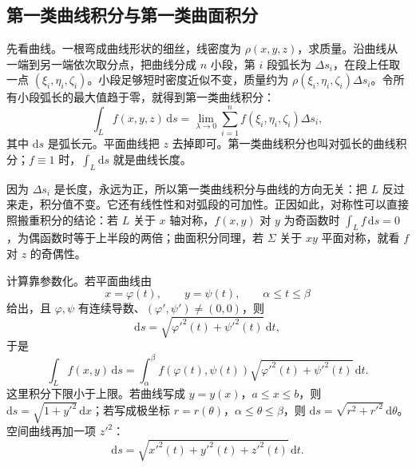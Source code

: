 \subsection{第一类曲线积分与第一类曲面积分}

先看曲线。一根弯成曲线形状的细丝，线密度为 $\rho(x,y,z)$，求质量。沿曲线从一端到另一端依次取分点，把曲线分成 $n$ 小段，第 $i$ 段弧长为 $\Delta s_i$，在段上任取一点 $(\xi_i,\eta_i,\zeta_i)$。小段足够短时密度近似不变，质量约为 $\rho(\xi_i,\eta_i,\zeta_i)\Delta s_i$。令所有小段弧长的最大值趋于零，就得到第一类曲线积分：
\[
    \int_L f(x,y,z)\,\mathrm ds
    =\lim_{\lambda\to0}\sum_{i=1}^{n}f(\xi_i,\eta_i,\zeta_i)\Delta s_i ,
\]
其中 $\mathrm ds$ 是弧长元。平面曲线把 $z$ 去掉即可。第一类曲线积分也叫对弧长的曲线积分；$f\equiv1$ 时，$\int_L\mathrm ds$ 就是曲线长度。

因为 $\Delta s_i$ 是长度，永远为正，所以第一类曲线积分与曲线的方向无关：把 $L$ 反过来走，积分值不变。它还有线性性和对弧段的可加性。正因如此，对称性可以直接照搬重积分的结论：若 $L$ 关于 $x$ 轴对称，$f(x,y)$ 对 $y$ 为奇函数时 $\int_L f\,\mathrm ds=0$，为偶函数时等于上半段的两倍；曲面积分同理，若 $\Sigma$ 关于 $xy$ 平面对称，就看 $f$ 对 $z$ 的奇偶性。

计算靠参数化。若平面曲线由
\[
    x=\varphi(t),\qquad y=\psi(t),\qquad \alpha\le t\le\beta
\]
给出，且 $\varphi,\psi$ 有连续导数、$(\varphi',\psi')\ne(0,0)$，则
\[
    \mathrm ds=\sqrt{\varphi'^2(t)+\psi'^2(t)}\,\mathrm dt ,
\]
于是
\[
    \int_L f(x,y)\,\mathrm ds
    =\int_\alpha^\beta f(\varphi(t),\psi(t))
    \sqrt{\varphi'^2(t)+\psi'^2(t)}\,\mathrm dt .
\]
这里积分下限小于上限。若曲线写成 $y=y(x)$，$a\le x\le b$，则 $\mathrm ds=\sqrt{1+y'^2}\,\mathrm dx$；若写成极坐标 $r=r(\theta)$，$\alpha\le\theta\le\beta$，则 $\mathrm ds=\sqrt{r^2+r'^2}\,\mathrm d\theta$。空间曲线再加一项 $z'^2$：
\[
    \mathrm ds=\sqrt{x'^2(t)+y'^2(t)+z'^2(t)}\,\mathrm dt .
\]

